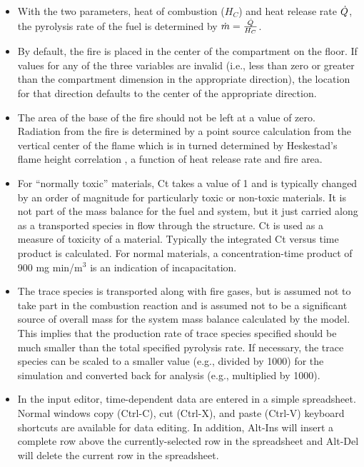 \begin{itemize}
\item With the two parameters, heat of combustion ($H_C$) and heat release rate $\dot{Q}$, the pyrolysis rate of the fuel is determined by $\dot{m}=\frac{\dot{Q}}{H_C}$.  
\item By default, the fire is placed in the center of the compartment on the floor.  If values for any of the three variables are invalid (i.e., less than zero or greater than the compartment dimension in the appropriate direction), the location for that direction defaults to the center of the appropriate direction. 
\item The area of the base of the fire should not be left at a value of zero. Radiation from the fire is determined by a point source calculation from the vertical center of the flame which is in turned determined by Heskestad's flame height correlation \cite{Heskestad:2002}, a function of heat release rate and fire area.
\item For “normally toxic” materials, Ct takes a value of 1 and is typically changed by an order of magnitude for particularly toxic or non-toxic materials.  It is not part of the mass balance for the fuel and system, but it just carried along as a transported species in flow through the structure. Ct is used as a measure of toxicity of a material.  Typically the integrated Ct versus time product is calculated. For normal materials, a concentration-time product of 900 mg min/m$^3$ is an indication of incapacitation.
\item The trace species is transported along with fire gases, but is assumed not to take part in the combustion reaction and is assumed not to be a significant source of overall mass for the system mass balance calculated by the model. This implies that the production rate of trace species specified should be much smaller than the total specified pyrolysis rate. If necessary, the trace species can be scaled to a smaller value (e.g., divided by 1000) for the simulation and converted back for analysis (e.g., multiplied by 1000).
\item In the input editor, time-dependent data are entered in a simple spreadsheet. Normal windows copy (Ctrl-C), cut (Ctrl-X), and paste (Ctrl-V) keyboard shortcuts are available for data editing. In addition, Alt-Ins will insert a complete row above the currently-selected row in the spreadsheet and Alt-Del will delete the current row in the spreadsheet.
\end{itemize}

